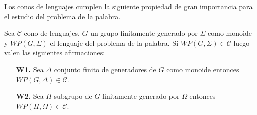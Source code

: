 \documentclass[tesis.tex]{subfiles}
\begin{document}
Los conos de lenguajes cumplen la siguiente propiedad de gran importancia para el estudio del problema de la palabra.
\medskip
\begin{prop}\label{prop-cono-wp}
	Sea $\mathcal{C}$ cono de lenguajes, $G$ un grupo finitamente generado por $\Sigma$ como monoide y $WP(G, \Sigma)$ el lenguaje del problema de la palabra. 
	Si $WP(G, \Sigma) \in \mathcal{C}$ luego valen las siguientes afirmaciones:
	\begin{itemize}
		\item[\textbf{W1.}] Sea $\Delta$ conjunto finito de generadores de $G$ como monoide entonces $WP(G, \Delta) \in \mathcal{C}$. 
		\item[\textbf{W2.}] Sea $H$ subgrupo de $G$ finitamente generado por $\Omega$ entonces $WP(H, \Omega) \in \mathcal{C}$.
	\end{itemize} 
\end{prop}
\end{document}
